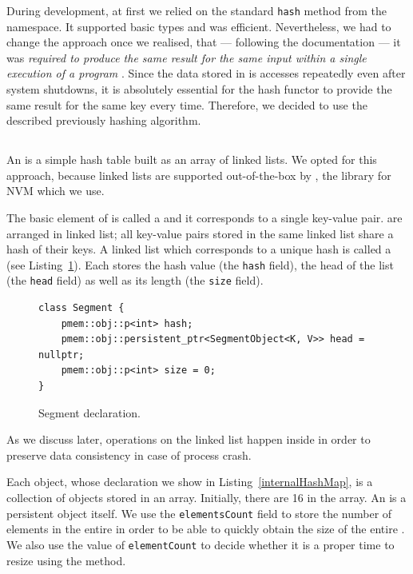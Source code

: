     During development, at first we relied on the standard \texttt{hash} method from the \std namespace. 
    It supported basic \std types and was efficient.
    Nevertheless, we had to change the approach once we realised, that --- following the documentation --- it was \textit{required to produce the same result for the same input within a single execution of a program} \cite{StdHash}.
    Since the data stored in \PHT is accesses repeatedly even after system shutdowns, it is absolutely essential for the hash functor to provide the same result for the same key every time. 
    Therefore, we decided to use the described previously hashing algorithm.

\subsection{\internalHashMap}

    An \internalHashMap is a simple hash table built as an array of linked lists.
    We opted for this approach, because linked lists are supported out-of-the-box by \libpmemobj, the library for NVM which we use. 
    
    The basic element of \internalHashMap is called a \SegmentObject and it corresponds to a single key-value pair. 
    \SegmentObject are arranged in linked list; all key-value pairs stored in the same linked list share a hash of their keys. 
    A linked list which corresponds to a unique hash is called a \Segment (see Listing~\ref{Segment}). 
    Each \Segment stores the hash value (the \texttt{hash} field), the head of the list (the \texttt{head} field) as well as its length (the \texttt{size} field).

\begin{figure}[ht]
\renewcommand{\figurename}{Listing}
\begin{lstlisting}
class Segment {
    pmem::obj::p<int> hash;
    pmem::obj::persistent_ptr<SegmentObject<K, V>> head = nullptr;
    pmem::obj::p<int> size = 0;
}
\end{lstlisting}
\caption{Segment declaration.}
\label{Segment}
\end{figure}

    As we discuss later, operations on the linked list happen inside  in order to preserve data consistency in case of process crash.
    
    Each \internalHashMap object, whose declaration we show in Listing~\ref{internalHashMap}, is a collection of \Segment objects stored in an array. 
    Initially, there are 16 \Segments in the \segments array. 
    An \internalHashMap is a persistent object itself. 
    We use the \texttt{elementsCount} field to store the number of elements in the entire \internalHashMap in order to be able to quickly obtain the size of the entire \NvmHashMap. 
    We also use the value of \texttt{elementCount} to decide whether it is a proper time to resize \internalHashMap using the \expandMethod method.

